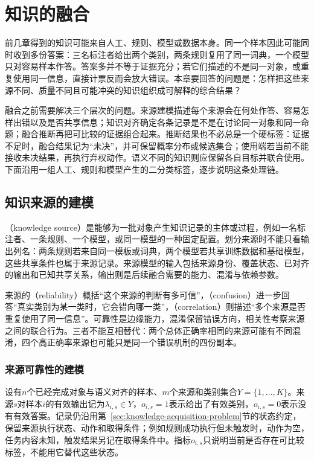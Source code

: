\chapter{知识的融合}
\label{chap:knowledge-fusion}

前几章得到的知识可能来自人工、规则、模型或数据本身。同一个样本因此可能同时收到多份答案：三名标注者给出两个类别，两条规则复用了同一词典，一个模型只对容易样本作答。答案多并不等于证据充分；若它们描述的不是同一对象，或重复使用同一信息，直接计票反而会放大错误。本章要回答的问题是：怎样把这些来源不同、质量不同且可能冲突的知识组织成可解释的综合结果？

融合之前需要解决三个层次的问题。来源建模描述每个来源会在何处作答、容易怎样出错以及是否共享信息；知识对齐确定各条记录是不是在讨论同一对象和同一命题；融合推断再把可比较的证据组合起来。推断结果也不必总是一个硬标签：证据不足时，融合结果记为“未决”，并可保留概率分布或候选集合；使用端若当前不能接收未决结果，再执行弃权动作。语义不同的知识则应保留各自目标并联合使用。下面沿用一组人工、规则和模型产生的二分类标签，逐步说明这条处理链。

\section{知识来源的建模}
\label{sec:knowledge-fusion-source-modeling}

（knowledge source）是能够为一批对象产生知识记录的主体或过程，例如一名标注者、一条规则、一个模型，或同一模型的一种固定配置。划分来源时不能只看输出列名：两条规则若来自同一模板或词典，两个模型若共享训练数据和基础模型，这些共享条件也属于来源记录。来源模型的输入包括来源身份、覆盖状态、已对齐的输出和已知共享关系，输出则是后续融合需要的能力、混淆与依赖参数。

来源的（reliability）概括“这个来源的判断有多可信”，（confusion）进一步回答“真实类别为某一类时，它会错向哪一类”，（correlation）则描述“多个来源是否重复使用了同一信息”。可靠性是边缘能力，混淆保留错误方向，相关性考察来源之间的联合行为。三者不能互相替代：两个总体正确率相同的来源可能有不同混淆，四个高正确率来源也可能只是同一个错误机制的四份副本。

\subsection{来源可靠性的建模}
\label{sec:knowledge-fusion-reliability}

设有$n$个已经完成对象与语义对齐的样本、$m$个来源和类别集合$Y=\{1,\ldots,K\}$。来源$s$对样本$i$的有效输出记为$\lambda_{i,s}\in Y$，$o_{i,s}=1$表示给出了有效类别，$o_{i,s}=0$表示没有有效答案。记录仍沿用第~\ref{sec:knowledge-acquisition-problem}节的状态约定，保留来源执行状态、动作和取得条件；例如规则成功执行但未触发时，动作为空，任务内容未知，触发结果另记在取得条件中。指标$o_{i,s}$只说明当前是否存在可比较标签，不能用它替代这些状态。


